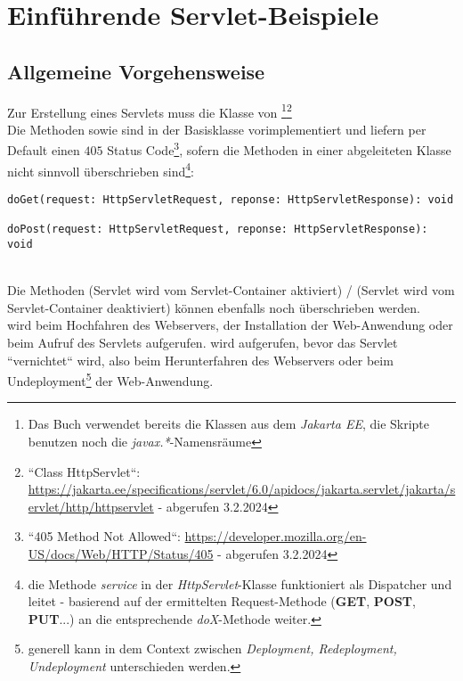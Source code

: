 \usepackage{lstmisc}\section{Einführende Servlet-Beispiele}

\subsection{Allgemeine Vorgehensweise}

Zur Erstellung eines Servlets muss die Klasse von \footnote{
    Das Buch verwendet bereits die Klassen aus dem \textit{Jakarta EE}, die Skripte benutzen noch die \textit{javax.*}-Namensräume
}\footnote{
    ``Class HttpServlet``: \url{https://jakarta.ee/specifications/servlet/6.0/apidocs/jakarta.servlet/jakarta/servlet/http/httpservlet} - abgerufen 3.2.2024
}\\

\noindent
Die Methoden  sowie  sind in der Basisklasse vorimplementiert und liefern per Default einen $405$ Status Code\footnote{
    ``405 Method Not Allowed``: \url{https://developer.mozilla.org/en-US/docs/Web/HTTP/Status/405} - abgerufen 3.2.2024
}, sofern die Methoden in einer abgeleiteten Klasse nicht sinnvoll überschrieben sind\footnote{
die Methode \textit{service} in der \textit{HttpServlet}-Klasse funktioniert als Dispatcher und leitet - basierend auf der ermittelten Request-Methode (\textbf{GET}, \textbf{POST}, \textbf{PUT}...) an die entsprechende \textit{doX}-Methode weiter.
}:

\begin{verbatim}
doGet(request: HttpServletRequest, reponse: HttpServletResponse): void

doPost(request: HttpServletRequest, reponse: HttpServletResponse): void
\end{verbatim}\\

\noindent
Die Methoden  (Servlet wird vom Servlet-Container aktiviert) /  (Servlet wird vom Servlet-Container deaktiviert) können ebenfalls noch überschrieben werden.\\

\noindent
{} wird beim Hochfahren des Webservers, der Installation der Web-Anwendung oder beim Aufruf des Servlets aufgerufen.
 wird aufgerufen, bevor das Servlet ``vernichtet`` wird, also beim Herunterfahren des Webservers oder beim Undeployment\footnote{
generell kann in dem Context zwischen \textit{Deployment, Redeployment, Undeployment} unterschieden werden.
} der Web-Anwendung. \\

